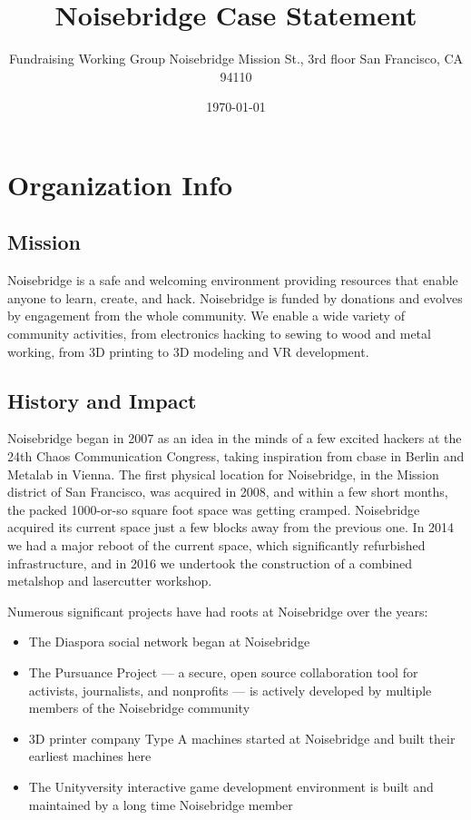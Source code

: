\documentclass[12pt]{article}
\title{Noisebridge Case Statement}
\author{Fundraising Working Group \newline Noisebridge \newline 2169 Mission St., 3rd floor \newline San Francisco, CA 94110}
\date{\today}
\begin{document}
\maketitle

\tableofcontents
\clearpage





\section{Organization Info}



\subsection{Mission}

Noisebridge is a safe and welcoming environment providing resources that enable anyone to learn, create, and hack. Noisebridge is funded by donations and evolves by engagement from the whole community. We enable a wide variety of community activities, from electronics hacking to sewing to wood and metal working, from 3D printing to 3D modeling and VR development.



\subsection{History and Impact}

Noisebridge began in 2007 as an idea in the minds of a few excited hackers at the 24th Chaos Communication Congress, taking inspiration from cbase in Berlin and Metalab in Vienna. The first physical location for Noisebridge, in the Mission district of San Francisco, was acquired in 2008, and within a few short months, the packed 1000-or-so square foot space was getting cramped. Noisebridge acquired its current space just a few blocks away from the previous one. In 2014 we had a major reboot of the current space, which significantly refurbished infrastructure, and in 2016 we undertook the construction of a combined metalshop and lasercutter workshop.

Numerous significant projects have had roots at Noisebridge over the years:

\vspace{0.5em}

\begin{itemize}
    \item The Diaspora social network began at Noisebridge
    \item The Pursuance Project — a secure, open source collaboration tool for activists, journalists, and nonprofits — is actively developed by multiple members of the Noisebridge community
    \item 3D printer company Type A machines started at Noisebridge and built their earliest machines here
    \item The Unityversity interactive game development environment is built and maintained by a long time Noisebridge member
\end{itemize}
\end{document}
